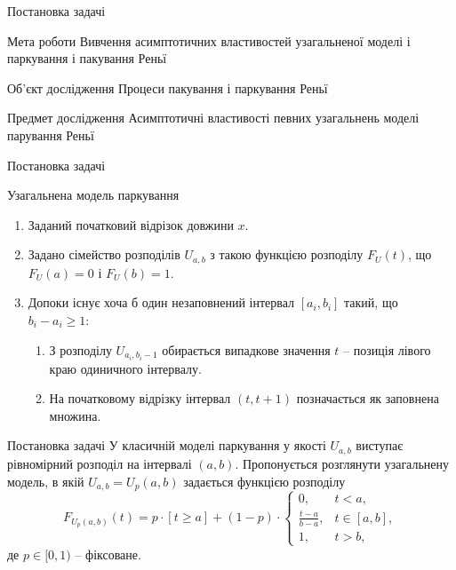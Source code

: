 \begin{frame}{Постановка задачі}
	\vspace{-8pt}
	\begin{block}{Мета роботи}
		 Вивчення асимптотичних властивостей узагальненої моделі і паркування і пакування Реньї
	\end{block} 

	\begin{block}{Об'єкт дослідження}
		Процеси пакування і паркування Реньї
	\end{block}
	
	\begin{block}{Предмет дослідження}
		Асимптотичні властивості певних узагальнень моделі парування Реньї
	\end{block}
\end{frame}

\begin{frame}{Постановка задачі}
	\begin{block}{Узагальнена модель паркування}
	\begin{enumerate}
		\item Заданий початковий відрізок довжини $x$.
		\item Задано сімейство розподілів $U_{a,b}$ з такою функцією розподілу $F_{U}(t)$, що $F_{U}(a)=0$ і $F_{U}(b)=1$.
		\item Допоки існує хоча б один незаповнений інтервал $[a_i, b_i]$ такий, що $b_i-a_i \geq 1$:
		\begin{enumerate}
			\item З розподілу $U_{a_i,b_i - 1}$ обирається випадкове значення $t$ -- позиція лівого краю одиничного інтервалу.
			\item На початковому відрізку інтервал $(t, t+1)$ позначається як заповнена множина.
		\end{enumerate}
	\end{enumerate}
	\end{block}
\end{frame}

\begin{frame}{Постановка задачі}
	У класичній моделі паркування у якості $U_{a,b}$ виступає рівномірний розподіл на інтервалі $(a,b)$. Пропонується розглянути узагальнену модель, в якій  $U_{a,b}=U_{p}(a,b)$ задається функцією розподілу
	\begin{equation*}
	F_{U_{p}(a,b)}(t)=p \cdot [t \geq a] + (1-p)\cdot\begin{cases}
	0, &t<a,\\
	\frac{t-a}{b-a}, &t \in[a,b],\\
	1, &t > b,
	\end{cases}
	\end{equation*}
	де $p \in [0,1)$ -- фіксоване.
\note{
}
\end{frame}

